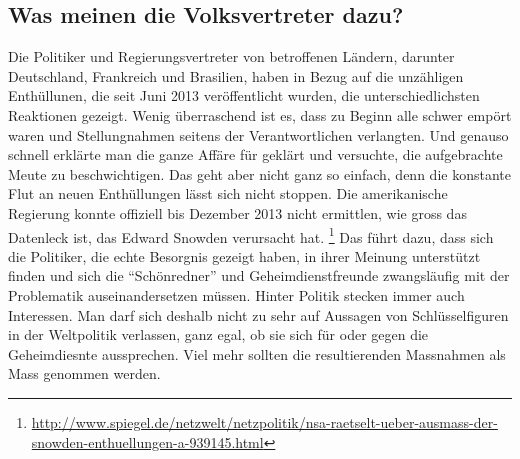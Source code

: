 \subsection{Was meinen die Volksvertreter dazu?}
Die Politiker und Regierungsvertreter von betroffenen Ländern, darunter Deutschland, Frankreich und Brasilien, haben in Bezug auf die unzähligen Enthüllunen, die seit Juni 2013 veröffentlicht wurden, die unterschiedlichsten Reaktionen gezeigt. Wenig überraschend ist es, dass zu Beginn alle schwer empört waren und Stellungnahmen seitens der Verantwortlichen verlangten. Und genauso schnell erklärte man die ganze Affäre für geklärt und versuchte, die aufgebrachte Meute zu beschwichtigen. Das geht aber nicht ganz so einfach, denn die konstante Flut an neuen Enthüllungen lässt sich nicht stoppen. Die amerikanische Regierung konnte offiziell bis Dezember 2013 nicht ermittlen, wie gross das Datenleck ist, das Edward Snowden verursacht hat.
\footnote{\url{http://www.spiegel.de/netzwelt/netzpolitik/nsa-raetselt-ueber-ausmass-der-snowden-enthuellungen-a-939145.html}}
Das führt dazu, dass sich die Politiker, die echte Besorgnis gezeigt haben, in ihrer Meinung unterstützt finden und sich die ``Schönredner'' und Geheimdienstfreunde zwangsläufig mit der Problematik auseinandersetzen müssen.
Hinter Politik stecken immer auch Interessen. Man darf sich deshalb nicht zu sehr auf Aussagen von Schlüsselfiguren in der Weltpolitik verlassen, ganz egal, ob sie sich für oder gegen die Geheimdiesnte aussprechen. Viel mehr sollten die resultierenden Massnahmen als Mass genommen werden.

